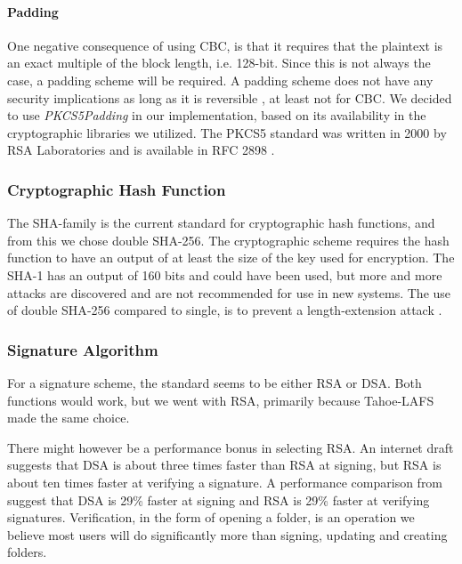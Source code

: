 \documentclass[pdftex,english,10pt,b5paper,twoside]{book}
\begin{document}
\paragraph{Padding} One negative consequence of using \ac{CBC}, is that it
requires that the plaintext is an exact multiple of the block length, i.e.
128-bit. Since this is not always the case, a padding scheme will be required.
A padding scheme does not have any security implications as long as it is
reversible \cite{schneier}, at least not for \ac{CBC}. We decided to use
\emph{PKCS5Padding} in our implementation, based on its availability in the
cryptographic libraries we utilized. The PKCS5 standard was written in 2000 by
RSA Laboratories and is available in RFC 2898 \cite{rfc2898}.

\subsubsection{Cryptographic Hash Function}

The \ac{SHA}-family is the current standard for cryptographic hash functions,
and from this we chose double \ac{SHA}-256. The cryptographic scheme requires
the hash function to have an output of at least the size of the key used for
encryption. The \ac{SHA}-1 has an output of 160 bits and could have been used,
but more and more attacks are discovered %
and are not recommended for use in new systems. The use of double \ac{SHA}-256 compared to
single, is to prevent a length-extension attack \cite{schneier}.

\subsubsection{Signature Algorithm}

For a signature scheme, the standard seems to be either \ac{RSA} or \ac{DSA}.
Both functions would work, but we went with \ac{RSA}, primarily because
Tahoe-\ac{LAFS} made the same choice.

There might however be a performance bonus in selecting \ac{RSA}. An internet
draft \cite{dsa_sha2} suggests that \ac{DSA} is about three times faster than
\ac{RSA} at signing, but \ac{RSA} is about ten times faster at verifying a
signature. A performance comparison from \citet{msdn_perf} suggest that
\ac{DSA} is 29\% faster at signing and \ac{RSA} is 29\% faster at verifying
signatures. Verification, in the form of opening a folder, is an operation we
believe most users will do significantly more than signing, updating and
creating folders.
\end{document}
